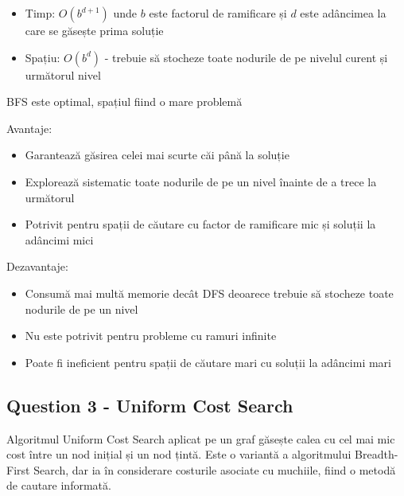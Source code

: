 \begin{itemize}
    \item Timp: $O(b^{d+1})$ unde $b$ este factorul de ramificare și $d$ este adâncimea la care se găsește prima soluție
    \item Spațiu: $O(b^d)$ - trebuie să stocheze toate nodurile de pe nivelul curent și următorul nivel
\end{itemize}
\par BFS este optimal, spațiul fiind o mare problemă
\par Avantaje:
\begin{itemize}
	\item Garantează găsirea celei mai scurte căi până la soluție
	\item Explorează sistematic toate nodurile de pe un nivel înainte de a trece la următorul
	\item Potrivit pentru spații de căutare cu factor de ramificare mic și soluții la adâncimi mici
\end{itemize}

\par Dezavantaje:
\begin{itemize}
	\item Consumă mai multă memorie decât DFS deoarece trebuie să stocheze toate nodurile de pe un nivel
	\item Nu este potrivit pentru probleme cu ramuri infinite
	\item Poate fi ineficient pentru spații de căutare mari cu soluții la adâncimi mari
\end{itemize}

\pagebreak

\subsection{Question 3 - Uniform Cost Search}

\par Algoritmul Uniform Cost Search aplicat pe un graf găsește calea cu cel mai mic cost între un nod inițial și un nod țintă. Este o variantă a algoritmului Breadth-First Search, dar ia în considerare costurile asociate cu muchiile, fiind o metodă de cautare informată.


